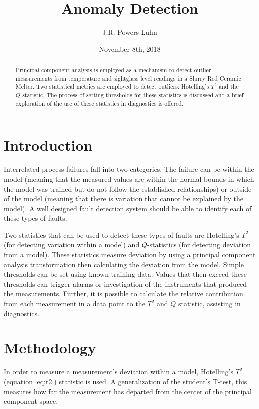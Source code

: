\documentclass{IEEEtran}
\author{J.R. Powers-Luhn}
\title{Anomaly Detection}
\date{November 8th, 2018}
\begin{document}
\maketitle

\begin{abstract}

Principal component analysis is employed as a mechanism to detect outlier measurements from temperature and sightglass level readings in a Slurry Red Ceramic Melter. Two statistical metrics are employed to detect outliers: Hotelling's $T^2$ and the $Q$-statistic. The process of setting thresholds for these statistics is discussed and a brief exploration of the use of these statistics in diagnostics is offered.

\end{abstract}

\section{Introduction}

Interrelated process failures fall into two categories. The failure can be within the model (meaning that the measured values are within the normal bounds in which the model was trained but do not follow the established relationships) or outside of the model (meaning that there is variation that cannot be explained by the model). A well designed fault detection system should be able to identify each of these types of faults.

Two statistics that can be used to detect these types of faults are Hotelling's $T^2$ (for detecting variation within a model) and $Q$-statistics (for detecting deviation from a model). These statistics measure deviation by using a principal component analysis transformation then calculating the deviation from the model. Simple thresholds can be set using known training data. Values that then exceed these thresholds can trigger alarms or investigation of the instruments that produced the measurements. Further, it is possible to calculate the relative contribution from each measurement in a data point to the $T^2$ and $Q$ statistic, assisting in diagnostics.

\section{Methodology}

In order to measure a measurement's deviation within a model, Hotelling's $T^2$ (equation \ref{eq:t2}) statistic is used. A generalization of the student's T-test, this measures how far the measurement has departed from the center of the principal component space. 
\end{document}
